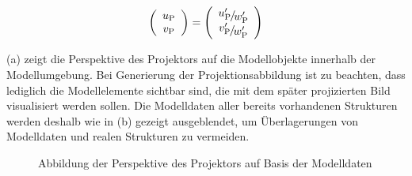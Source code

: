 \begin{equation}
\left(\begin{array}{c}
u_{\ind{P}}\\
v_{\ind{P}}
\end{array}\right)
=
\left(\begin{array}{c}
\nicefrac{u_{\ind{P}}'}{w_{\ind{P}}'}\\
\nicefrac{v_{\ind{P}}'}{w_{\ind{P}}'}
\end{array}\right)
\end{equation}

 (a) zeigt die Perspektive des Projektors auf die Modellobjekte innerhalb der Modellumgebung. Bei Generierung der Projektionsabbildung ist zu beachten, dass lediglich die Modellelemente sichtbar sind, die mit dem später projizierten Bild visualisiert werden sollen. Die Modelldaten aller bereits vorhandenen Strukturen werden deshalb wie in  (b) gezeigt ausgeblendet, um Überlagerungen von Modelldaten und realen Strukturen zu vermeiden.

\prever{
}

\begin{figure}[!ht]
	\begin{center}
	\hspace{5mm}
	\caption{Abbildung der Perspektive des Projektors auf Basis der Modelldaten}
	\label{fig.projpersp_gui}
	\end{center}
\end{figure}%
%
%
%
%
